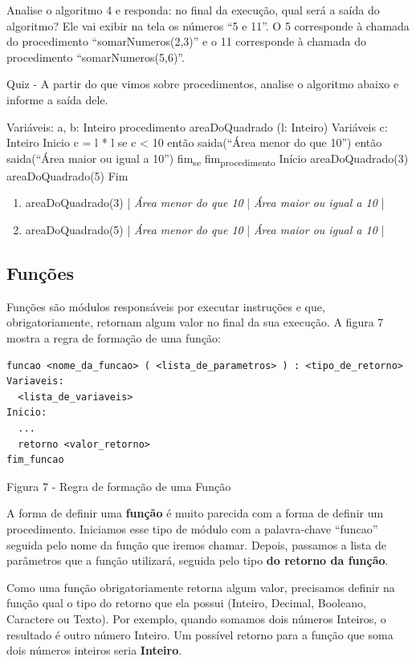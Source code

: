 \documentclass[11pt]{article}
\begin{document}
Analise o algoritmo 4 e responda: no final da execução, qual será a saída do algoritmo? Ele vai exibir na tela os números “5 e 11”. O 5 corresponde à chamada do procedimento “somarNumeros(2,3)” e o 11 corresponde à chamada do procedimento “somarNumeros(5,6)”.

Quiz - A partir do que vimos sobre procedimentos, analise o algoritmo abaixo e informe a saída dele.

Variáveis:
  a, b: Inteiro
  procedimento areaDoQuadrado (l: Inteiro)
  Variáveis
    c: Inteiro
  Inicio
    c = l * l
    se c < 10 então
         saida(“Área menor do que 10”)
    então
         saida(“Área maior ou igual a 10”)
    fim\textsubscript{se}
  fim\textsubscript{procedimento}
Início
  areaDoQuadrado(3)
  areaDoQuadrado(5)
Fim

\begin{enumerate}
\item areaDoQuadrado(3) | \emph{Área menor do que 10} | \emph{Área maior ou igual a 10} |
\item areaDoQuadrado(5) | \emph{Área menor do que 10} | \emph{Área maior ou igual a 10} |
\end{enumerate}

\subsection{Funções}
\label{sec:orga2d71d3}
Funções são módulos responsáveis por executar instruções e que, obrigatoriamente, retornam algum valor no final da sua execução. A figura 7 mostra a regra de formação de uma função:

\begin{verbatim}
funcao <nome_da_funcao> ( <lista_de_parametros> ) : <tipo_de_retorno>
Variaveis:
  <lista_de_variaveis>
Inicio:
  ...
  retorno <valor_retorno>
fim_funcao
\end{verbatim}

\caption{Figura 7 - Regra de formação de uma Função}



A forma de definir uma \textbf{função} é muito parecida com a forma de definir um procedimento. Iniciamos esse tipo de módulo com a palavra-chave “funcao” seguida pelo nome da função que iremos chamar. Depois, passamos a lista de parâmetros que a função utilizará, seguida pelo tipo \textbf{do retorno da função}.

Como uma função obrigatoriamente retorna algum valor, precisamos definir na função qual o tipo do retorno que ela possui (Inteiro, Decimal, Booleano, Caractere ou Texto). Por exemplo, quando somamos dois números Inteiros, o resultado é outro número Inteiro. Um possível retorno para a função que soma dois números inteiros seria \textbf{Inteiro}.
\end{document}
